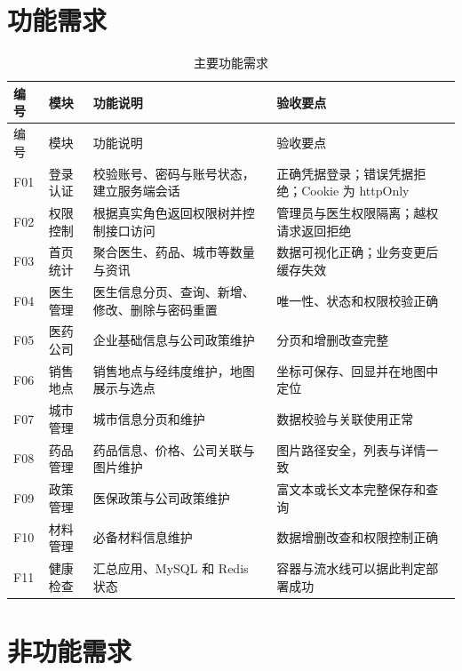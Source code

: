 \documentclass[UTF8,a4paper,12pt,openany,fontset=windows]{ctexrep}
\begin{document}
\section{功能需求}

\begin{longtable}{p{1.4cm}p{3.1cm}p{4.6cm}p{4.6cm}}
  \caption{主要功能需求}\label{tab:functional-requirements}\\
  \toprule
  编号 & 模块 & 功能说明 & 验收要点 \\
  \midrule
  \endfirsthead
  \toprule
  编号 & 模块 & 功能说明 & 验收要点 \\
  \midrule
  \endhead
  F01 & 登录认证 & 校验账号、密码与账号状态，建立服务端会话 & 正确凭据登录；错误凭据拒绝；Cookie 为 httpOnly \\
  F02 & 权限控制 & 根据真实角色返回权限树并控制接口访问 & 管理员与医生权限隔离；越权请求返回拒绝 \\
  F03 & 首页统计 & 聚合医生、药品、城市等数量与资讯 & 数据可视化正确；业务变更后缓存失效 \\
  F04 & 医生管理 & 医生信息分页、查询、新增、修改、删除与密码重置 & 唯一性、状态和权限校验正确 \\
  F05 & 医药公司 & 企业基础信息与公司政策维护 & 分页和增删改查完整 \\
  F06 & 销售地点 & 销售地点与经纬度维护，地图展示与选点 & 坐标可保存、回显并在地图中定位 \\
  F07 & 城市管理 & 城市信息分页和维护 & 数据校验与关联使用正常 \\
  F08 & 药品管理 & 药品信息、价格、公司关联与图片维护 & 图片路径安全，列表与详情一致 \\
  F09 & 政策管理 & 医保政策与公司政策维护 & 富文本或长文本完整保存和查询 \\
  F10 & 材料管理 & 必备材料信息维护 & 数据增删改查和权限控制正确 \\
  F11 & 健康检查 & 汇总应用、MySQL 和 Redis 状态 & 容器与流水线可以据此判定部署成功 \\
  \bottomrule
\end{longtable}

\section{非功能需求}
\end{document}
